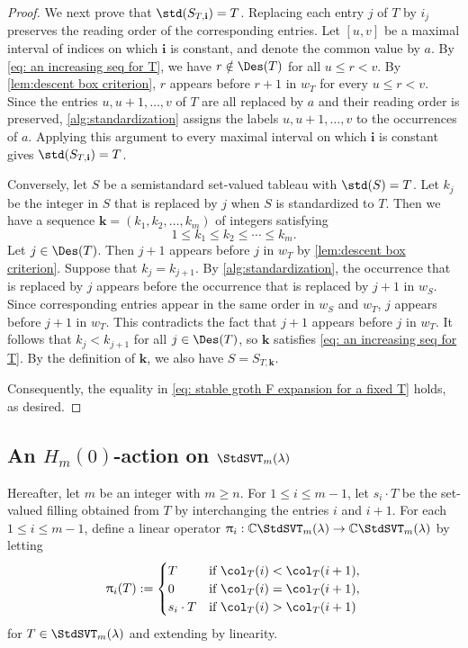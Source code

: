 \documentclass[12pt, reqno]{amsart}
\numberwithin{equation}{section}
\numberwithin{figure}{section}
\numberwithin{table}{section}
\theoremstyle{definition}
\def\C{\mathbb C}
\begin{document}
\begin{proof}
We next prove that $\std(S_{T,\mathbf{i}})=T$.
Replacing each entry $j$ of $T$ by $i_j$ preserves the reading order of the corresponding entries.
Let $[u,v]$ be a maximal interval of indices on which $\mathbf{i}$ is constant, and denote the common value by $a$.
By \cref{eq: an increasing seq for T}, we have $r\notin\Des(T)$ for all $u \le r < v$.
By \cref{lem:descent box criterion}, $r$ appears before $r+1$ in $w_T$ for every $u \le r < v$.
Since the entries $u,u+1,\ldots,v$ of $T$ are all replaced by $a$ and their reading order is preserved, \cref{alg:standardization} assigns the labels $u,u+1,\ldots,v$ to the occurrences of $a$.
Applying this argument to every maximal interval on which $\mathbf{i}$ is constant gives $\std(S_{T,\mathbf{i}})=T$.


Conversely, let $S$ be a semistandard set-valued tableau with $\std(S)=T$.
Let $k_j$ be the integer in $S$ that is replaced by $j$ when $S$ is standardized to $T$.
Then we have a sequence $\mathbf{k}=(k_1,k_2,\ldots,k_m)$ of integers satisfying
\[
1\le k_1\le k_2\le\cdots\le k_m.
\]
Let $j\in\Des(T)$. 
Then $j+1$ appears before $j$ in $w_T$ by \cref{lem:descent box criterion}.
Suppose that $k_j=k_{j+1}$.
By \cref{alg:standardization}, the occurrence that is replaced by $j$ appears before the occurrence that is replaced by $j+1$ in $w_S$.
Since corresponding entries appear in the same order in $w_S$ and $w_T$, $j$ appears before $j+1$ in $w_T$.
This contradicts the fact that $j+1$ appears before $j$ in $w_T$.
It follows that $k_j<k_{j+1}$ for all $j\in\Des(T)$, so $\mathbf{k}$ satisfies \cref{eq: an increasing seq for T}.
By the definition of $\mathbf{k}$, we also have $S=S_{T,\mathbf{k}}$.

Consequently, the equality in \cref{eq: stable groth F expansion for a fixed T} holds, as desired.
\end{proof}



\subsection[A 0-Hecke action on standard set-valued tableaux]{An $H_m(0)$-action on $\StdSVT_m(\lambda)$}

Hereafter, let $m$ be an integer with $m \ge n$.
For $1\le i\le m-1$, let $s_i\cdot T$ be the set-valued filling obtained from $T$ by interchanging the entries $i$ and $i+1$.
For each $1\le i\le m-1$, define a linear operator $\uppi_i:\C \StdSVT_m(\lambda) \rightarrow \C \StdSVT_m(\lambda)$ by letting
\begin{align}\label{eq: svt action}
\uppi_i(T):=
\begin{cases}
T & \text{if $\col_T(i)<\col_T(i+1)$},\\
0 & \text{if $\col_T(i)=\col_T(i+1)$},\\
s_i \cdot T & \text{if $\col_T(i)>\col_T(i+1)$}
\end{cases}
\end{align}
for $T\in\StdSVT_m(\lambda)$ and extending by linearity.
\end{document}
